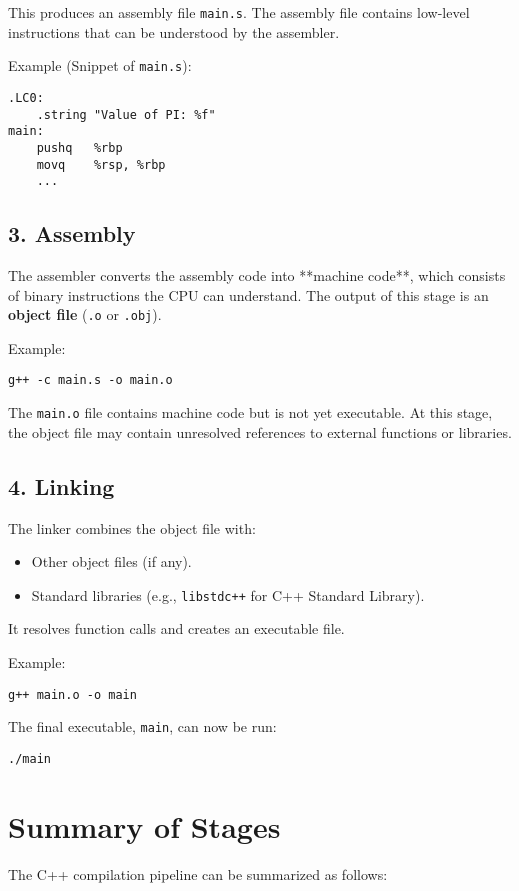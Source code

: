 This produces an assembly file \texttt{main.s}. The assembly file contains low-level instructions that can be understood by the assembler.

\noindent Example (Snippet of \texttt{main.s}):
\begin{verbatim}
.LC0:
    .string "Value of PI: %f"
main:
    pushq   %rbp
    movq    %rsp, %rbp
    ...
\end{verbatim}

\subsection{3. Assembly}
The assembler converts the assembly code into **machine code**, which consists of binary instructions the CPU can understand. The output of this stage is an \textbf{object file} (\texttt{.o} or \texttt{.obj}).

\noindent Example:
\begin{verbatim}
g++ -c main.s -o main.o
\end{verbatim}

The \texttt{main.o} file contains machine code but is not yet executable. At this stage, the object file may contain unresolved references to external functions or libraries.

\subsection{4. Linking}
The linker combines the object file with:
\begin{itemize}
    \item Other object files (if any).
    \item Standard libraries (e.g., \texttt{libstdc++} for C++ Standard Library).
\end{itemize}

It resolves function calls and creates an executable file.

\noindent Example:
\begin{verbatim}
g++ main.o -o main
\end{verbatim}

The final executable, \texttt{main}, can now be run:
\begin{verbatim}
./main
\end{verbatim}

\section{Summary of Stages}
The C++ compilation pipeline can be summarized as follows:

